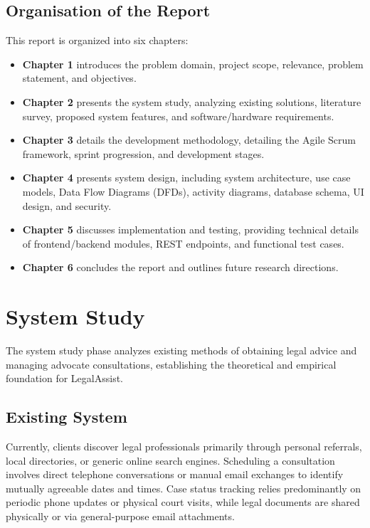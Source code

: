 \documentclass[12pt,a4paper]{report}
\begin{document}
\section{Organisation of the Report}
This report is organized into six chapters:
\begin{itemize}
    \item \textbf{Chapter 1} introduces the problem domain, project scope, relevance, problem statement, and objectives.
    \item \textbf{Chapter 2} presents the system study, analyzing existing solutions, literature survey, proposed system features, and software/hardware requirements.
    \item \textbf{Chapter 3} details the development methodology, detailing the Agile Scrum framework, sprint progression, and development stages.
    \item \textbf{Chapter 4} presents system design, including system architecture, use case models, Data Flow Diagrams (DFDs), activity diagrams, database schema, UI design, and security.
    \item \textbf{Chapter 5} discusses implementation and testing, providing technical details of frontend/backend modules, REST endpoints, and functional test cases.
    \item \textbf{Chapter 6} concludes the report and outlines future research directions.
\end{itemize}

\chapter{System Study}

The system study phase analyzes existing methods of obtaining legal advice and managing advocate consultations, establishing the theoretical and empirical foundation for LegalAssist.

\section{Existing System}
Currently, clients discover legal professionals primarily through personal referrals, local directories, or generic online search engines. Scheduling a consultation involves direct telephone conversations or manual email exchanges to identify mutually agreeable dates and times. Case status tracking relies predominantly on periodic phone updates or physical court visits, while legal documents are shared physically or via general-purpose email attachments.
\end{document}
